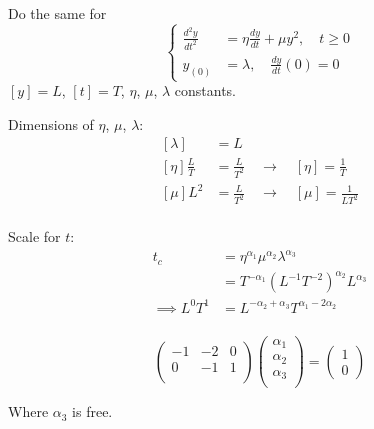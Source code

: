 \documentclass[12pt]{article}
\begin{document}
Do the same for
\begin{equation}
  \left\{
  \begin{aligned}
    \frac{d^2y}{dt^2} &= \eta \frac{dy}{dt} + \mu y^2,\quad t \ge 0 \\
    y_{(0)} &= \lambda, \quad \frac{dy}{dt}(0) = 0
  \end{aligned} \right.
\end{equation}
$[y]=L$, $[t]=T$, $\eta$, $\mu$, $\lambda$ constants.

Dimensions of $\eta$, $\mu$, $\lambda$:
\begin{equation}
  \begin{aligned}
    [\lambda] &= L \\
    [\eta]\frac{L}{T} &= \frac{L}{T^2} \quad\longrightarrow\quad [\eta] = \frac{1}{T} \\
    [\mu]L^2 &= \frac{L}{T^2} \quad\longrightarrow\quad [\mu] = \frac{1}{LT^2} \\
  \end{aligned}
\end{equation}

Scale for $t$:
\begin{equation}
  \begin{aligned}
    t_c &= \eta^{\alpha_1}\mu^{\alpha_2}\lambda^{\alpha_3} \\
    &= T^{-\alpha_1}(L^{-1}T^{-2})^{\alpha_2}L^{\alpha_3} \\
    \implies L^0T^1 &= L^{-\alpha_2+\alpha_3}T^{\alpha_1-2\alpha_2} \\
  \end{aligned}
\end{equation}

\begin{equation}
  \begin{pmatrix}
    -1 & -2 & 0 \\
    0 & -1 & 1 \\
  \end{pmatrix}
\begin{pmatrix}
  \alpha_1 \\
  \alpha_2 \\
  \alpha_3 \\
\end{pmatrix}
=
\begin{pmatrix}
  1\\0
\end{pmatrix}
\end{equation}

Where $\alpha_3$ is free.
\end{document}
